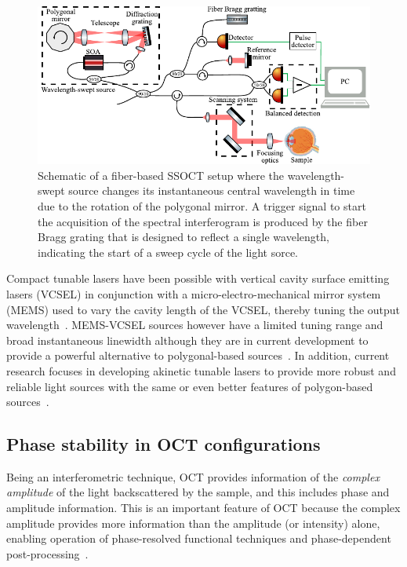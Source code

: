 \begin{figure}[htb!]
    \centering
    \includegraphics[width=\textwidth]{Figures/TheoreticalBasis/SSOCT_Scheme.pdf}
    \caption[Schematic of a fiber-based SSOCT setup.]{Schematic of a fiber-based SSOCT setup where the wavelength-swept source changes its instantaneous central wavelength in time due to the rotation of the polygonal mirror. A trigger signal to start the acquisition of the spectral interferogram is produced by the fiber Bragg grating that is designed to reflect a single wavelength, indicating the start of a sweep cycle of the light sorce.}
    \label{fig:SSOCT_Scheme}
\end{figure}

Compact tunable lasers have been possible with vertical cavity surface emitting lasers (VCSEL) in conjunction with a micro-electro-mechanical mirror system (MEMS) used to vary the cavity length of the VCSEL, thereby tuning the output wavelength~\cite{Vail1995_Tunable}. MEMS-VCSEL sources however have a limited tuning range and broad instantaneous linewidth although they are in current development to provide a powerful alternative to polygonal-based sources~\cite{Jayaraman2011_OCT}. In addition, current research focuses in developing akinetic tunable lasers to provide more robust and reliable light sources with the same or even better features of polygon-based sources~\cite{Lee2018_Akinetic}.

\subsection{Phase stability in OCT configurations}\label{sec:OCTConfigPhaseStab}

Being an interferometric technique, OCT provides information of the \textit{complex amplitude} of the light backscattered by the sample, and this includes phase and amplitude information. This is an important feature of OCT because the complex amplitude provides more information than the amplitude (or intensity) alone, enabling operation of phase-resolved functional techniques and phase-dependent post-processing~\cite{Park2020_Angiographic, Vakoc2005_Phaseresolved, White2003_vivo}.

